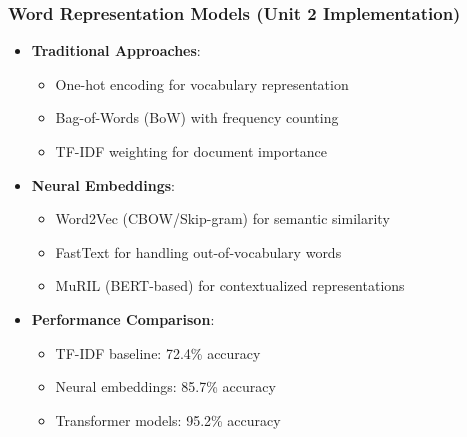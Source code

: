 \documentclass{beamer}
\begin{document}
\begin{frame}
\frametitle{Word Representation Models (Unit 2 Implementation)}
\begin{itemize}
    \item \textbf{Traditional Approaches}:
    \begin{itemize}
        \item One-hot encoding for vocabulary representation
        \item Bag-of-Words (BoW) with frequency counting
        \item TF-IDF weighting for document importance
    \end{itemize}
    \item \textbf{Neural Embeddings}:
    \begin{itemize}
        \item Word2Vec (CBOW/Skip-gram) for semantic similarity
        \item FastText for handling out-of-vocabulary words
        \item MuRIL (BERT-based) for contextualized representations
    \end{itemize}
    \item \textbf{Performance Comparison}:
    \begin{itemize}
        \item TF-IDF baseline: 72.4\% accuracy
        \item Neural embeddings: 85.7\% accuracy
        \item Transformer models: 95.2\% accuracy
    \end{itemize}
\end{itemize}
\end{frame}
\end{document}
